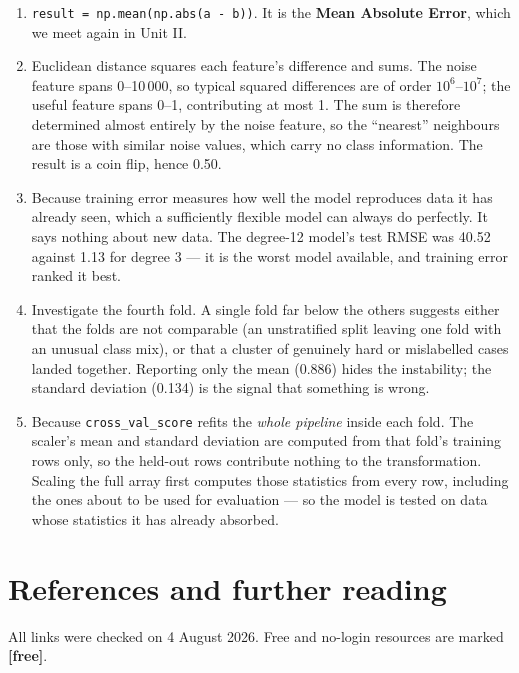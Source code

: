 \documentclass[11pt]{article}
\begin{document}
\begin{enumerate}[leftmargin=*, label=\textbf{Q\arabic*.}]
\item \texttt{result = np.mean(np.abs(a - b))}. It is the \textbf{Mean Absolute
Error}, which we meet again in Unit II.

\item Euclidean distance squares each feature's difference and sums. The noise
feature spans 0--10\,000, so typical squared differences are of order $10^6$--$10^7$;
the useful feature spans 0--1, contributing at most 1. The sum is therefore
determined almost entirely by the noise feature, so the ``nearest'' neighbours
are those with similar noise values, which carry no class information. The
result is a coin flip, hence 0.50.

\item Because training error measures how well the model reproduces data it has
already seen, which a sufficiently flexible model can always do perfectly. It
says nothing about new data. The degree-12 model's test RMSE was 40.52 against
1.13 for degree 3 --- it is the worst model available, and training error ranked
it best.

\item Investigate the fourth fold. A single fold far below the others suggests
either that the folds are not comparable (an unstratified split leaving one fold
with an unusual class mix), or that a cluster of genuinely hard or mislabelled
cases landed together. Reporting only the mean (0.886) hides the instability;
the standard deviation (0.134) is the signal that something is wrong.

\item Because \texttt{cross\_val\_score} refits the \emph{whole pipeline} inside
each fold. The scaler's mean and standard deviation are computed from that
fold's training rows only, so the held-out rows contribute nothing to the
transformation. Scaling the full array first computes those statistics from
every row, including the ones about to be used for evaluation --- so the model is
tested on data whose statistics it has already absorbed.

\end{enumerate}

\newpage
\section{References and further reading}

All links were checked on 4 August 2026. Free and no-login resources are marked
\textbf{[free]}.
\end{document}
